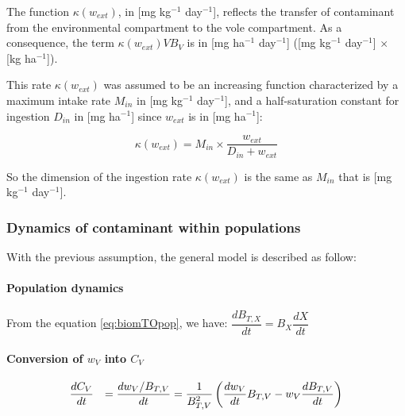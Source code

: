 \documentclass[11pt]{article}
\begin{document}
The function $\kappa(w_{ext})$, in [mg kg$^{-1}$ day$^{-1}$], reflects the transfer of contaminant from the environmental compartment to the vole compartment. As a consequence, the term $\kappa(w_{ext})V B_V$ is in [mg ha$^{-1}$ day$^{-1}$] ([mg kg$^{-1}$ day$^{-1}$] $\times$ [kg ha$^{-1}$]).


This rate $\kappa(w_{ext})$ was assumed to be an increasing function characterized by a maximum intake rate $M_{in}$ in [mg kg$^{-1}$ day$^{-1}$], and a half-saturation constant for ingestion $D_{in}$ in [mg ha$^{-1}$] since $w_{ext}$ is in [mg ha$^{-1}$]:

\begin{equation}
\kappa(w_{ext})= M_{in}\times \dfrac{ w_{ext}}{D_{in} + w_{ext}}
\end{equation}

So the dimension of the ingestion rate $\kappa(w_{ext})$ is the same as $M_{in}$ that is [mg kg$^{-1}$ day$^{-1}$].


\subsubsection{Dynamics of contaminant within populations}

With the previous assumption, the general model is described as follow:

\paragraph{Population dynamics}

From the equation \eqref{eq:biomTOpop}, we have: $\dfrac{d B_{T,X}}{dt} = B_X \dfrac{d X}{dt}$

\paragraph{Conversion of $w_V$ into $C_V$}

\begin{equation}
\begin{array}{c l}
\dfrac{d C_V}{dt} & = \dfrac{d w_V / B_{T,V}}{dt} = \dfrac{1}{B_{T,V}^2} \left( \dfrac{d w_V}{dt} B_{T,V} - w_V \dfrac{d B_{T,V}}{dt}\right) \\[3mm]
%
& \\[3mm]
\end{array}
\end{equation}
\end{document}

